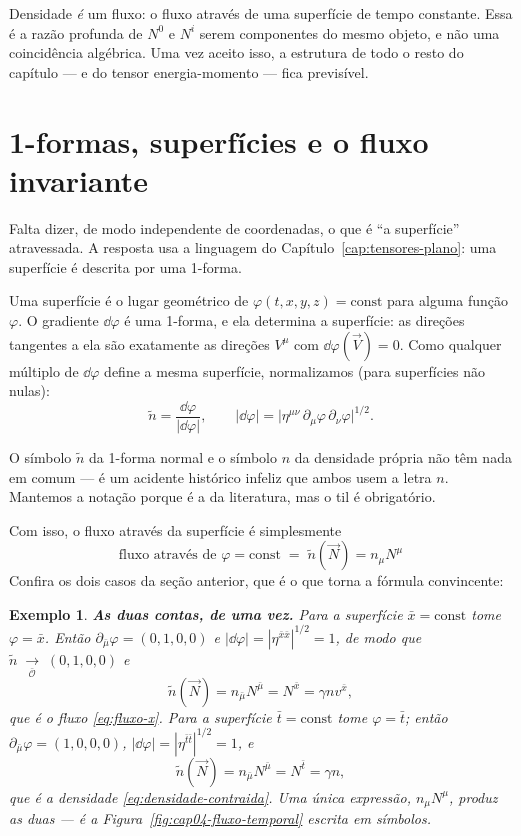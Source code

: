 \documentclass[12pt,a4paper,oneside]{book}
\theoremstyle{rgplain}
\newtheorem{example}{Exemplo}[chapter]
\theoremstyle{rgremark}
\newcommand{\obsl}{\bar{\mathcal{O}}}
\newcommand{\temcomp}[1]{\;\underset{#1}{\longrightarrow}\;}
\begin{document}
\begin{central}
Densidade \emph{é} um fluxo: o fluxo através de uma superfície de tempo
constante. Essa é a razão profunda de $N^0$ e $N^i$ serem componentes do
mesmo objeto, e não uma coincidência algébrica. Uma vez aceito isso, a
estrutura de todo o resto do capítulo --- e do tensor energia-momento --- fica
previsível.
\end{central}

\section{1-formas, superfícies e o fluxo invariante}
\label{sec:umaforma-superficie}

Falta dizer, de modo independente de coordenadas, o que é ``a superfície''
atravessada. A resposta usa a linguagem do Capítulo~\ref{cap:tensores-plano}:
uma superfície é descrita por uma 1-forma.

Uma superfície é o lugar geométrico de $\varphi(t,x,y,z)=\text{const}$ para
alguma função $\varphi$. O gradiente $\dd\varphi$ é uma 1-forma, e ela
determina a superfície: as direções tangentes a ela são exatamente as
direções $V^\mu$ com $\dd\varphi(\vec V)=0$. Como qualquer múltiplo de
$\dd\varphi$ define a mesma superfície, normalizamos (para superfícies não
nulas):
\begin{equation}
  \tilde n=\frac{\dd\varphi}{|\dd\varphi|},
  \qquad
  |\dd\varphi|=\bigl|\eta^{\mu\nu}\,\partial_\mu\varphi\,
  \partial_\nu\varphi\bigr|^{1/2} .
  \label{eq:normal-umaforma}
\end{equation}

\begin{atencao}
O símbolo $\tilde n$ da 1-forma normal e o símbolo $n$ da densidade própria
não têm nada em comum --- é um acidente histórico infeliz que ambos usem a
letra $n$. Mantemos a notação porque é a da literatura, mas o til é
obrigatório.
\end{atencao}

Com isso, o fluxo através da superfície é simplesmente
\begin{equation}
  \boxed{\ \text{fluxo através de } \varphi=\text{const}
  \;=\; \tilde n(\vec N)=n_\mu N^\mu\ }
  \label{eq:fluxo-invariante}
\end{equation}
Confira os dois casos da seção anterior, que é o que torna a fórmula
convincente:

\begin{example}
\textbf{As duas contas, de uma vez.}
Para a superfície $\bar x=\text{const}$ tome $\varphi=\bar x$. Então
$\partial_{\bar\mu}\varphi=(0,1,0,0)$ e
$|\dd\varphi|=|\eta^{\bar x\bar x}|^{1/2}=1$, de modo
que $\tilde n\temcomp{\obsl}(0,1,0,0)$ e
\[
  \tilde n(\vec N)=n_{\bar\mu}N^{\bar\mu}=N^{\bar x}=\gamma n v^{\bar x},
\]
que é o fluxo \eqref{eq:fluxo-x}. Para a superfície $\bar t=\text{const}$
tome $\varphi=\bar t$; então $\partial_{\bar\mu}\varphi=(1,0,0,0)$,
$|\dd\varphi|=|\eta^{\bar t\bar t}|^{1/2}=1$, e
\[
  \tilde n(\vec N)=n_{\bar\mu}N^{\bar\mu}=N^{\bar t}=\gamma n,
\]
que é a densidade \eqref{eq:densidade-contraida}. Uma única expressão,
$n_\mu N^\mu$, produz as duas --- é a Figura~\ref{fig:cap04-fluxo-temporal}
escrita em símbolos.
\end{example}
\end{document}
